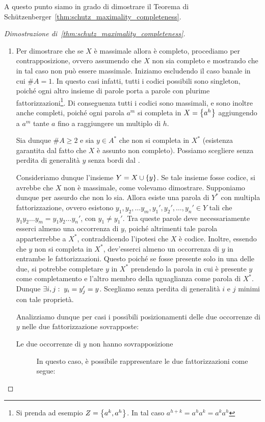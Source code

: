 A questo punto siamo in grado di dimostrare il Teorema di Schützenberger~\ref{thm:schutz_maximality_completeness}.
\begin{proof}[Dimostrazione di~\ref{thm:schutz_maximality_completeness}]
  \begin{enumerate}
    \item Per dimostrare che se \(X\) è massimale allora è completo, procediamo per contrapposizione, ovvero assumendo che \(X\) non sia completo e mostrando che in tal caso non può essere massimale.
      Iniziamo escludendo il caso banale in cui \(\# A = 1\). In questo casi infatti, tutti i codici possibili sono singleton, poiché ogni altro insieme di parole porta a parole con plurime fattorizzazioni\footnote{Si prenda ad esempio \(Z = \set{a^k,a^h}\). In tal caso \(a^{h+k} = a^h a^k = a^k a^h\)}.
      Di conseguenza tutti i codici sono massimali, e sono inoltre anche completi, poiché ogni parola \(a^m\) si completa in \(X = \set{a^h}\) aggiungendo a \(a^m\) tante \(a\) fino a raggiungere un multiplo di \(h\).

      Sia dunque \(\# A \geq 2\) e sia \(y \in A^*\) che non si completa in \(X^*\) (esistenza garantita dal fatto che \(X\) è assunto non completo).
      Possiamo scegliere senza perdita di generalità \(y\) senza bordi dal .

      Consideriamo dunque l'insieme \(Y=X\cup\set{y}\). Se tale insieme fosse codice, si avrebbe che \(X\) non è massimale, come volevamo dimostrare.
      Supponiamo dunque per assurdo che non lo sia.
      Allora esiste una parola di \(Y^*\) con multipla fattorizzazione, ovvero esistono \(y_1,y_2,\ldots y_m,y_1',y_2',\ldots,y_n' \in Y\) tali che \(y_1y_2\ldots y_m = y_1y_2\ldots y_n'\), con \(y_1\neq y_1'\).
      Tra queste parole deve necessariamente esserci almeno una occorrenza di \(y\), poiché altrimenti tale parola apparterrebbe a \(X^*\), contraddicendo l'ipotesi che \(X\) è codice.
      Inoltre, essendo che \(y\) non si completa in \(X^*\), dev'esserci almeno un occorrenza di \(y\) in entrambe le fattorizzazioni.
      Questo poiché se fosse presente solo in una delle due, si potrebbe completare \(y\) in \(X^*\) prendendo la parola in cui è presente \(y\) come completamento e l'altro membro della uguaglianza come parola di \(X^*\).
      Dunque \(\exists i,j :\; y_i=y_j'=y\). Scegliamo senza perdita di generalità \(i\) e \(j\) minimi con tale proprietà.

      Analizziamo dunque per casi i possibili posizionamenti delle due occorrenze di \(y\) nelle due fattorizzazione sovrapposte:
      \begin{description}
        \item[Le due occorrenze di \(y\) non hanno sovrapposizione]
          In questo caso, è possibile rappresentare le due fattorizzazioni come segue:
          \begin{figure}[H]
            \centering
\end{figure}
\end{description}
\end{enumerate}
\end{proof}
